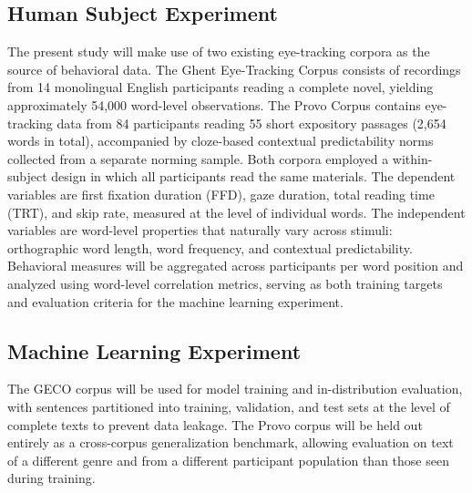 \documentclass[12pt]{article}
\begin{document}
\subsection{Human Subject Experiment}

The present study will make use of two existing eye-tracking corpora as the
source of behavioral data. The Ghent Eye-Tracking Corpus
\citep[GECO;][]{cop2017presenting} consists of recordings from 14 monolingual
English participants reading a complete novel, yielding approximately 54,000
word-level observations. The Provo Corpus \citep{luke2018provo} contains
eye-tracking data from 84 participants reading 55 short expository passages
(2,654 words in total), accompanied by cloze-based contextual predictability
norms collected from a separate norming sample. Both corpora employed a
within-subject design in which all participants read the same materials. The
dependent variables are first fixation duration (FFD), gaze duration, total
reading time (TRT), and skip rate, measured at the level of individual words.
The independent variables are word-level properties that naturally vary across
stimuli: orthographic word length, word frequency, and contextual
predictability. Behavioral measures will be aggregated across participants per
word position and analyzed using word-level correlation metrics, serving as
both training targets and evaluation criteria for the machine learning
experiment.

\subsection{Machine Learning Experiment}

The GECO corpus will be used for model training and in-distribution evaluation,
with sentences partitioned into training, validation, and test sets at the
level of complete texts to prevent data leakage. The Provo corpus will be held
out entirely as a cross-corpus generalization benchmark, allowing evaluation on
text of a different genre and from a different participant population than those
seen during training.
\end{document}
